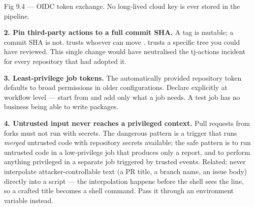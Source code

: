 \begin{wbfigure}{Fig 9.4 — OIDC token exchange. No long-lived cloud key is ever stored in the pipeline.}
\end{wbfigure}

\textbf{2. Pin third-party actions to a full commit SHA.} A tag is mutable; a commit SHA is not.  trusts whoever can move .  trusts a specific tree you could have reviewed. This single change would have neutralised the tj-actions incident for every repository that had adopted it.

\textbf{3. Least-privilege job tokens.} The automatically provided repository token defaults to broad permissions in older configurations. Declare  explicitly at workflow level --- start from  and add only what a job needs. A test job has no business being able to write packages.

\textbf{4. Untrusted input never reaches a privileged context.} Pull requests from forks must not run with secrets. The dangerous pattern is a trigger that runs \emph{merged} untrusted code with repository secrets available; the safe pattern is to run untrusted code in a low-privilege job that produces only a report, and to perform anything privileged in a separate job triggered by trusted events. Related: never interpolate attacker-controllable text (a PR title, a branch name, an issue body) directly into a  script --- the interpolation happens before the shell sees the line, so a crafted title becomes a shell command. Pass it through an environment variable instead.

